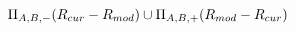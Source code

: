 \[
  \Pi_{A,B,-}(R_{cur} - R_{mod}) \cup   \Pi_{A,B,+}(R_{mod} - R_{cur})
\]

%
